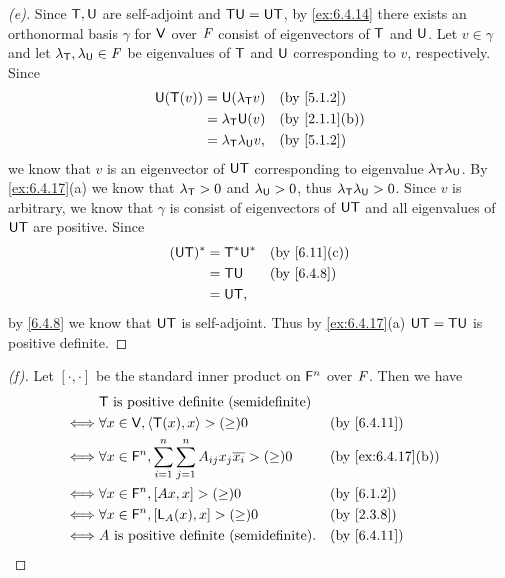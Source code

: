 \begin{proof}[(e)]
  Since \(\mathsf{T}, \mathsf{U}\) are self-adjoint and \(\mathsf{T} \mathsf{U} = \mathsf{U} \mathsf{T}\), by \cref{ex:6.4.14} there exists an orthonormal basis \(\gamma\) for \(\mathsf{V}\) over \(\mathit{F}\) consist of eigenvectors of \(\mathsf{T}\) and \(\mathsf{U}\).
  Let \(v \in \gamma\) and let \(\lambda_{\mathsf{T}}, \lambda_{\mathsf{U}} \in \mathit{F}\) be eigenvalues of \(\mathsf{T}\) and \(\mathsf{U}\) corresponding to \(v\), respectively.
  Since
  \begin{align*}
    \U(\T(v)) & = \U(\lambda_{\T} v)           &  & \text{(by \cref{5.1.2})}    \\
              & = \lambda_{\T} \U(v)           &  & \text{(by \cref{2.1.1}(b))} \\
              & = \lambda_{\T} \lambda_{\U} v, &  & \text{(by \cref{5.1.2})}
  \end{align*}
  we know that \(v\) is an eigenvector of \(\mathsf{U} \mathsf{T}\) corresponding to eigenvalue \(\lambda_{\mathsf{T}} \lambda_{\mathsf{U}}\).
  By \cref{ex:6.4.17}(a) we know that \(\lambda_{\mathsf{T}} > 0\) and \(\lambda_{\mathsf{U}} > 0\), thus \(\lambda_{\mathsf{T}} \lambda_{\mathsf{U}} > 0\).
  Since \(v\) is arbitrary, we know that \(\gamma\) is consist of eigenvectors of \(\mathsf{U} \mathsf{T}\) and all eigenvalues of \(\mathsf{U} \mathsf{T}\) are positive.
  Since
  \begin{align*}
    (\U \T)^* & = \T^* \U^* &  & \text{(by \cref{6.11}(c))} \\
              & = \T \U     &  & \text{(by \cref{6.4.8})}   \\
              & = \U \T,
  \end{align*}
  by \cref{6.4.8} we know that \(\mathsf{U} \mathsf{T}\) is self-adjoint.
  Thus by \cref{ex:6.4.17}(a) \(\mathsf{U} \mathsf{T} = \mathsf{T} \mathsf{U}\) is positive definite.
\end{proof}

\begin{proof}[(f)]
  Let \([\cdot, \cdot]\) be the standard inner product on \(\mathsf{F}^n\) over \(\mathit{F}\).
  Then we have
  \begin{align*}
         & \T \text{ is positive definite (semidefinite)}                                                                               \\
    \iff & \forall x \in \V, \inn{\T(x), x} > (\geq) 0                                             &  & \text{(by \cref{6.4.11})}       \\
    \iff & \forall x \in \vs{F}^n, \sum_{i = 1}^n \sum_{j = 1}^n A_{i j} x_j \conj{x_i} > (\geq) 0 &  & \text{(by \cref{ex:6.4.17}(b))} \\
    \iff & \forall x \in \vs{F}^n, [Ax, x] > (\geq) 0                                              &  & \text{(by \cref{6.1.2})}        \\
    \iff & \forall x \in \vs{F}^n, [\L_A(x), x] > (\geq) 0                                         &  & \text{(by \cref{2.3.8})}        \\
    \iff & A \text{ is positive definite (semidefinite)}.                                          &  & \text{(by \cref{6.4.11})}
  \end{align*}
\end{proof}

